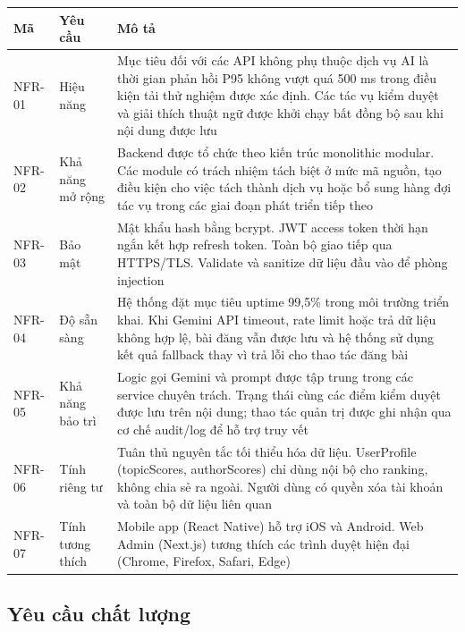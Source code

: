 {\def\LTcaptype{none} %
\begin{longtable}{
  |>{\centering\arraybackslash}p{}
  |>{\centering\arraybackslash}p{}
  |>{\centering\arraybackslash}p{}|}
\endhead
\hline
\endlastfoot
Mã & Yêu cầu & Mô tả \\ \hline
NFR-01 & Hiệu năng & Mục tiêu đối với các API không phụ thuộc dịch vụ AI
là thời gian phản hồi P95 không vượt quá 500 ms trong điều kiện tải thử
nghiệm được xác định. Các tác vụ kiểm duyệt và giải thích thuật ngữ được
khởi chạy bất đồng bộ sau khi nội dung được lưu \\ \hline
NFR-02 & Khả năng mở rộng & Backend được tổ chức theo kiến trúc
monolithic modular. Các module có trách nhiệm tách biệt ở mức mã nguồn,
tạo điều kiện cho việc tách thành dịch vụ hoặc bổ sung hàng đợi tác vụ
trong các giai đoạn phát triển tiếp theo \\ \hline
NFR-03 & Bảo mật & Mật khẩu hash bằng bcrypt. JWT access token thời hạn
ngắn kết hợp refresh token. Toàn bộ giao tiếp qua HTTPS/TLS. Validate và
sanitize dữ liệu đầu vào để phòng injection \\ \hline
NFR-04 & Độ sẵn sàng & Hệ thống đặt mục tiêu uptime 99,5\% trong môi
trường triển khai. Khi Gemini API timeout, rate limit hoặc trả dữ liệu
không hợp lệ, bài đăng vẫn được lưu và hệ thống sử dụng kết quả fallback
thay vì trả lỗi cho thao tác đăng bài \\ \hline
NFR-05 & Khả năng bảo trì & Logic gọi Gemini và prompt được tập trung
trong các service chuyên trách. Trạng thái cùng các điểm kiểm duyệt được
lưu trên nội dung; thao tác quản trị được ghi nhận qua cơ chế audit/log
để hỗ trợ truy vết \\ \hline
NFR-06 & Tính riêng tư & Tuân thủ nguyên tắc tối thiểu hóa dữ liệu.
UserProfile (topicScores, authorScores) chỉ dùng nội bộ cho ranking,
không chia sẻ ra ngoài. Người dùng có quyền xóa tài khoản và toàn bộ dữ
liệu liên quan \\ \hline
NFR-07 & Tính tương thích & Mobile app (React Native) hỗ trợ iOS và
Android. Web Admin (Next.js) tương thích các trình duyệt hiện đại
(Chrome, Firefox, Safari, Edge) \\ \hline
\end{longtable}
}

\subsection{Yêu cầu chất
lượng}\label{yuxeau-cux1ea7u-chux1ea5t-lux1b0ux1ee3ng}

